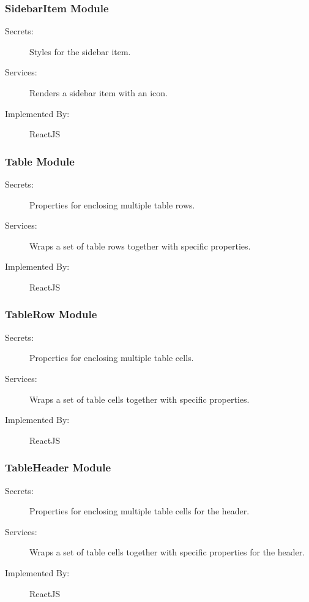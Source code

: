 \documentclass[12pt, titlepage]{article}
\begin{document}
\subsubsection{SidebarItem Module \label{mSidebarItemModule}}
\begin{description}
\item[Secrets:]Styles for the sidebar item.
\item[Services:]Renders a sidebar item with an icon.
\item[Implemented By:] ReactJS
\end{description}

\subsubsection{Table Module \label{mTableModule}}
\begin{description}
\item[Secrets:]Properties for enclosing multiple table rows.
\item[Services:]Wraps a set of table rows together with specific properties.
\item[Implemented By:] ReactJS
\end{description}

\subsubsection{TableRow Module \label{mTableRowModule}}
\begin{description}
\item[Secrets:]Properties for enclosing multiple table cells.
\item[Services:]Wraps a set of table cells together with specific properties.
\item[Implemented By:] ReactJS
\end{description}

\subsubsection{TableHeader Module \label{mTableHeaderModule}}
\begin{description}
\item[Secrets:]Properties for enclosing multiple table cells for the header.
\item[Services:]Wraps a set of table cells together with specific properties for the header.
\item[Implemented By:] ReactJS
\end{description}
\end{document}
